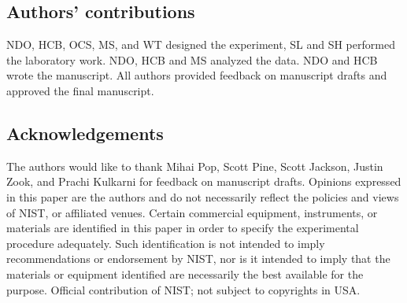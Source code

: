 \documentclass[linenumbers]{bmcart}
\begin{document}
\begin{backmatter}
\subsection*{Authors' contributions}
NDO, HCB, OCS, MS, and WT designed the experiment, SL and SH performed the laboratory work.
NDO, HCB and MS analyzed the data.
NDO and HCB wrote the manuscript.
All authors provided feedback on manuscript drafts and approved the final manuscript.


\subsection*{Acknowledgements}
 The authors would like to thank Mihai
Pop, Scott Pine, Scott Jackson, Justin Zook, and Prachi Kulkarni for
feedback on manuscript drafts. Opinions expressed in this paper are the
authors and do not necessarily reflect the policies and views of NIST,
or affiliated venues. Certain commercial equipment, instruments, or
materials are identified in this paper in order to specify the
experimental procedure adequately. Such identification is not intended
to imply recommendations or endorsement by NIST, nor is it intended to
imply that the materials or equipment identified are necessarily the
best available for the purpose. Official contribution of NIST; not
subject to copyrights in USA.







\end{backmatter}
\end{document}
